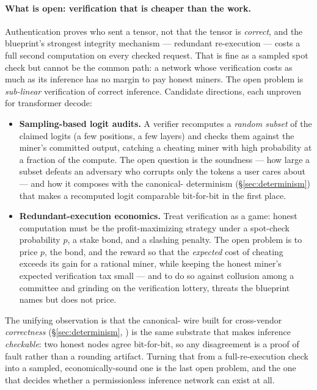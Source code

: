 \documentclass[11pt]{article}
\begin{document}
\paragraph{What is open: verification that is cheaper than the work.} Authentication proves who sent a
tensor, not that the tensor is \emph{correct}, and the blueprint's strongest integrity mechanism ---
redundant re-execution --- costs a full second computation on every checked request. That is fine as a
sampled spot check but cannot be the common path: a network whose verification costs as much as its
inference has no margin to pay honest miners. The open problem is \emph{sub-linear} verification of correct
inference. Candidate directions, each unproven for transformer decode:
\begin{itemize}[leftmargin=1.4em,itemsep=2pt]
\item \textbf{Sampling-based logit audits.} A verifier recomputes a \emph{random subset} of the claimed
logits (a few positions, a few layers) and checks them against the miner's committed output, catching a
cheating miner with high probability at a fraction of the compute. The open question is the soundness
--- how large a subset defeats an adversary who corrupts only the tokens a user cares about --- and how it
composes with the canonical- determinism (\S\ref{sec:determinism}) that makes a recomputed logit
comparable bit-for-bit in the first place.
\item \textbf{Redundant-execution economics.} Treat verification as a game: honest computation must be the
profit-maximizing strategy under a spot-check probability $p$, a stake bond, and a slashing penalty. The
open problem is to price $p$, the bond, and the reward so that the \emph{expected} cost of cheating exceeds
its gain for a rational miner, while keeping the honest miner's expected verification tax small --- and to
do so against collusion among a committee and grinding on the verification lottery, threats the blueprint
names but does not price.
\end{itemize}
The unifying observation is that the canonical- wire built for cross-vendor \emph{correctness}
(\S\ref{sec:determinism}, \cite{het}) is the same substrate that makes inference \emph{checkable}: two
honest nodes agree bit-for-bit, so any disagreement is a proof of fault rather than a rounding artifact.
Turning that from a full-re-execution check into a sampled, economically-sound one is the last open
problem, and the one that decides whether a permissionless inference network can exist at all.
\end{document}
